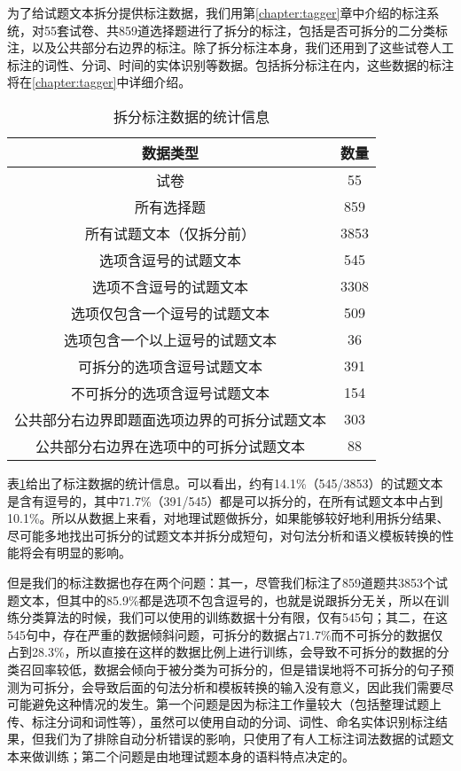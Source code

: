 \documentclass[master, winfont]{njuthesis}
\begin{document}
为了给试题文本拆分提供标注数据，我们用第\ref{chapter:tagger}章中介绍的标注系统，对55套试卷、共859道选择题进行了拆分的标注，包括是否可拆分的二分类标注，以及公共部分右边界的标注。除了拆分标注本身，我们还用到了这些试卷人工标注的词性、分词、时间的实体识别等数据。包括拆分标注在内，这些数据的标注将在\ref{chapter:tagger}中详细介绍。

\begin{table}[!htbp]
\begin{center}
\begin{tabular}{c|c}
\hline {数据类型} & {数量}\\
\hline 试卷 & 55\\
\hline 所有选择题 & 859 \\
\hline 所有试题文本（仅拆分前） & 3853\\
\hline 选项含逗号的试题文本 & 545\\
\hline 选项不含逗号的试题文本 & 3308 \\
\hline 选项仅包含一个逗号的试题文本 & 509\\
\hline 选项包含一个以上逗号的试题文本 & 36\\
\hline 可拆分的选项含逗号试题文本 & 391\\
\hline 不可拆分的选项含逗号试题文本 & 154\\
\hline 公共部分右边界即题面选项边界的可拆分试题文本 & 303 \\
\hline 公共部分右边界在选项中的可拆分试题文本 & 88 \\
\hline
\end{tabular}
\end{center}
\caption{\label{data_count} 拆分标注数据的统计信息}
\end{table}

表\ref{data_count}给出了标注数据的统计信息。可以看出，约有14.1\%（545/3853）的试题文本是含有逗号的，其中71.7\%（391/545）都是可以拆分的，在所有试题文本中占到10.1\%。所以从数据上来看，对地理试题做拆分，如果能够较好地利用拆分结果、尽可能多地找出可拆分的试题文本并拆分成短句，对句法分析和语义模板转换的性能将会有明显的影响。

但是我们的标注数据也存在两个问题：其一，尽管我们标注了859道题共3853个试题文本，但其中的85.9\%都是选项不包含逗号的，也就是说跟拆分无关，所以在训练分类算法的时候，我们可以使用的训练数据十分有限，仅有545句；其二，在这545句中，存在严重的数据倾斜问题，可拆分的数据占71.7\%而不可拆分的数据仅占到28.3\%，所以直接在这样的数据比例上进行训练，会导致不可拆分的数据的分类召回率较低，数据会倾向于被分类为可拆分的，但是错误地将不可拆分的句子预测为可拆分，会导致后面的句法分析和模板转换的输入没有意义，因此我们需要尽可能避免这种情况的发生。第一个问题是因为标注工作量较大（包括整理试题上传、标注分词和词性等），虽然可以使用自动的分词、词性、命名实体识别标注结果，但我们为了排除自动分析错误的影响，只使用了有人工标注词法数据的试题文本来做训练；第二个问题是由地理试题本身的语料特点决定的。
\end{document}
